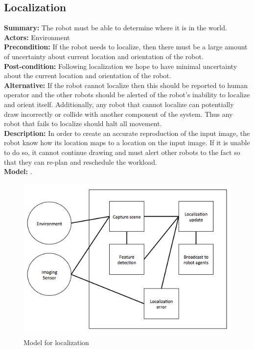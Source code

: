 \subsection{Localization}
\textbf{Summary:} The robot must be able to determine where it is in the world. \\
\textbf{Actors:} Environment \\
\textbf{Precondition:} If the robot needs to localize, then there must be a large amount of uncertainty about current location and orientation of the robot. \\
\textbf{Post-condition:} Following localization we hope to have minimal uncertainty about the current location and orientation of the robot. \\
\textbf{Alternative:} If the robot cannot localize then this should be reported to human operator and the other robots should be alerted of the robot's inability to localize and orient itself. Additionally, any robot that cannot localize can potentially draw incorrectly or collide with another component of the system. Thus any robot that fails to localize should halt all movement. \\
\textbf{Description:} In order to create an accurate reproduction of the input image, the robot know how its location maps to a location on the input image. If it is unable to do so, it cannot continue drawing and must alert other robots to the fact so that they can re-plan and reschedule the workload. \\
\textbf{Model:} .\\

\begin{figure}
 \centering
  \includegraphics[width=0.48\columnwidth]{figs/use_case-localization.jpg}
\caption{Model for localization}
 \label{fig:localize}
\end{figure}

